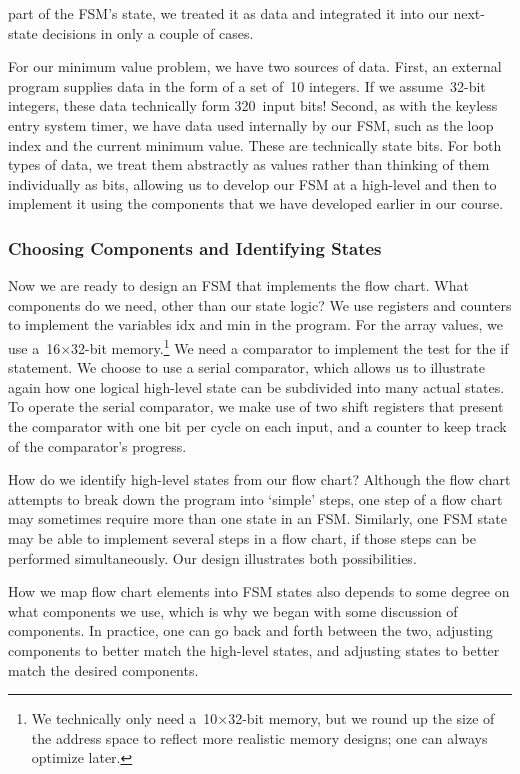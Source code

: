 part of the FSM's state, we treated it
as data and integrated it into our next-state decisions in only a couple
of cases.

For our minimum value problem, we have two sources of data.  First, an
external program supplies data in the form of a set of~10 integers.  If
we assume~\mbox{32-bit} integers, these data technically form 320~input bits!
Second, as with the keyless entry system timer, we have data used internally
by our FSM, such as the loop index and the current minimum value.  These
are technically state bits.  For both types of data, we treat them
abstractly as values rather than thinking of them individually as bits,
allowing us to develop our FSM at a high-level and then to implement it 
using the components that we have developed earlier in our course.\\

\subsubsection{Choosing Components and Identifying States}

Now we are ready to design an FSM that implements the flow chart.
What components do we need, other than our state logic?
We use registers and counters to implement the variables {\tfix idx}
and {\tfix min} in the program.
For the array {\tfix values}, we use a~\mbox{16$\times$32-bit} 
memory.\footnote{We technically only need a~\mbox{10$\times$32-bit} 
memory, but we round up the size of the address space to reflect more
realistic memory designs; one can always optimize later.}
We need a comparator to implement the test for the {\tfix if} statement.
We choose to use a serial comparator, which allows us to illustrate again
how one logical high-level state can be subdivided into many actual states.
To operate the serial comparator, we make use of two shift registers that 
present the comparator with one bit per cycle on each input, and a counter
to keep track of the comparator's progress.

How do we identify high-level states from our flow chart?  Although
the flow chart attempts to break down the program into `simple' steps,
one step of a flow chart may sometimes require more than one state
in an FSM.  Similarly, one FSM state may be able to implement several
steps in a flow chart, if those steps can be performed simultaneously.
Our design illustrates both possibilities.

How we map flow chart elements into FSM states also depends to some 
degree on what components we use, which is why we began with some discussion
of components.  In practice, one can go back and forth between the two, 
adjusting components to better match the high-level states, and adjusting 
states to better match the desired components.

